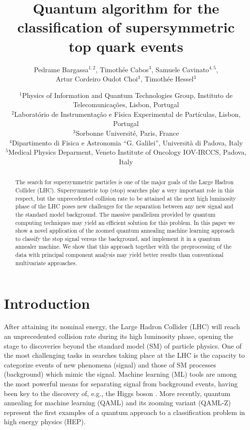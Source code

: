 \documentclass{article}
\title{Quantum algorithm for the classification of supersymmetric top quark events}
\author{Pedrame Bargassa$^{1,2}$, Timoth\'ee Cabos$^3$, Samuele Cavinato$^{4,5}$, \\
Artur Cordeiro Oudot Choi$^3$, Timoth\'ee Hessel$^3$}
\date{
  $^1$Physics of Information and Quantum Technologies Group, Instituto de
  Telecomunica\c{c}\~{o}es, Lisbon, Portugal\\
  $^2$Laborat\'orio de Instrumenta\c{c}\~ao e F\'isica Experimental de Part\'iculas, Lisbon, Portugal\\
  $^3$Sorbonne Universit\'e, Paris, France\\
  $^4$Dipartimento di Fisica e Astronomia ``G. Galilei'', Universit\`a di Padova, Italy\\
  $^5$Medical Physics Deparment, Veneto Institute of Oncology IOV-IRCCS, Padova, Italy \\[2ex]
}
\begin{document}
\maketitle

\begin{abstract}

The search for supersymmetric particles is one of the major goals of the 
Large Hadron Collider (LHC). Supersymmetric top (stop) searches play a 
very important role in this respect, but the unprecedented collision rate 
to be attained at the next high luminosity phase of the LHC poses new 
challenges for the separation between any new signal and the standard 
model background. The massive parallelism provided by quantum computing 
techniques may yield an efficient solution for this problem. In this paper 
we show a novel application of the zoomed quantum annealing machine 
learning approach to classify the stop signal versus the background, and 
implement it in a quantum annealer machine. We show that this approach 
together with the preprocessing of the data with principal component 
analysis may yield better results than conventional multivariate 
approaches.

\end{abstract}

\section{Introduction}
\label{s:intro}

After attaining its nominal energy, the Large Hadron Collider (LHC) will 
reach an unprecedented collision rate during its high luminosity phase, 
opening the stage to discoveries beyond the standard model (SM) of 
particle physics. One of the most challenging tasks in searches taking 
place at the LHC is the capacity to categorize events of new phenomena 
(signal) and those of SM processes (background) which mimic the signal. 
Machine learning (ML) tools are among the most powerful means for 
separating signal from background events, having been key to the discovery 
of, e.g., the Higgs boson \cite{HgDisc1,HgDisc2}. More recently, 
quantum annealing for machine learning (QAML) \cite{nature} and its 
zooming variant (QAML-Z) \cite{qamlz} represent the first examples of a 
quantum approach to a classification problem in high energy physics (HEP).
\end{document}
